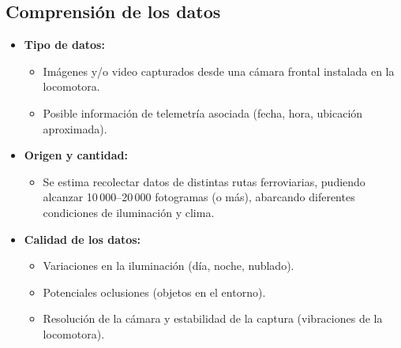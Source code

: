 \documentclass[
11pt, %
]{ProyectoVpC}
\begin{document}
\subsection{Comprensión de los datos}
\begin{itemize}
  \item \textbf{Tipo de datos:} 
    \begin{itemize}
      \item Imágenes y/o video capturados desde una cámara frontal instalada en la locomotora.
      \item Posible información de telemetría asociada (fecha, hora, ubicación aproximada).
    \end{itemize}
  \item \textbf{Origen y cantidad:} 
    \begin{itemize}
      \item Se estima recolectar datos de distintas rutas ferroviarias, pudiendo alcanzar 10\,000--20\,000 fotogramas (o más), abarcando diferentes condiciones de iluminación y clima.
    \end{itemize}
  \item \textbf{Calidad de los datos:}
    \begin{itemize}
      \item Variaciones en la iluminación (día, noche, nublado).
      \item Potenciales oclusiones (objetos en el entorno).
      \item Resolución de la cámara y estabilidad de la captura (vibraciones de la locomotora).
    \end{itemize}
\end{itemize}
\end{document}
